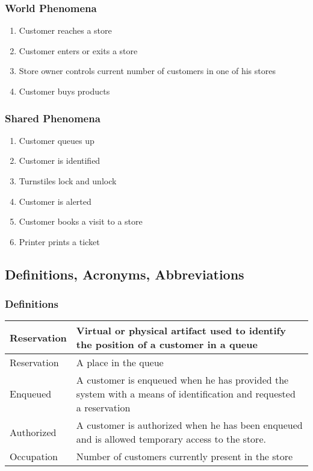 \subsubsection{World Phenomena}
\begin{enumerate}[label=WP\arabic*]
	\item Customer reaches a store
	\item Customer enters or exits a store
	\item Store owner controls current number of customers in one of his stores
	\item Customer buys products
\end{enumerate}
\subsubsection{Shared Phenomena}
\begin{enumerate}[label=SP\arabic*]
	\item Customer queues up
	\item Customer is identified %
	\item Turnstiles lock and unlock
	\item Customer is alerted%
	\item Customer books a visit to a store
	\item Printer prints a ticket
\end{enumerate}
\subsection{Definitions, Acronyms, Abbreviations}
\subsubsection{Definitions}
\begin{tabular}{ | m{5cm} | m{10cm} | }
	\hline
	Reservation & Virtual or physical artifact used to identify the position of a customer in a queue \\
	\hline
	Reservation & A place in the queue\\
	\hline
	Enqueued & A customer is enqueued when he has provided the system with a means of identification and requested a reservation\\
	\hline
	Authorized & A customer is authorized when he has been enqueued and is allowed temporary access to the store.\\
	\hline
	Occupation & Number of customers currently present in the store\\
	\hline
\end{tabular}
